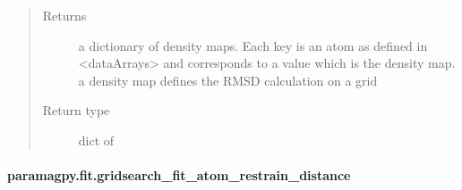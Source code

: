 \documentclass[a4paper,10pt,english,openany,oneside]{sphinxmanual}
\begin{document}
\begin{fulllineitems}
\begin{quote}
\begin{description}
\begin{itemize}
\end{itemize}

\item[{Returns}] \leavevmode
\sphinxAtStartPar
{} \textendash{} a dictionary of density maps. Each key is an atom
as defined in \textless{}dataArrays\textgreater{} and corresponds to a value
which is the density map.
a density map defines the RMSD calculation on a grid

\item[{Return type}] \leavevmode
\sphinxAtStartPar
dict of {\hyperref[\detokenize{reference/generated/paramagpy.fit.DensityMap:paramagpy.fit.DensityMap}]{}}

\end{description}\end{quote}

\end{fulllineitems}



\paragraph{paramagpy.fit.gridsearch\_fit\_atom\_restrain\_distance}
\label{\detokenize{reference/generated/paramagpy.fit.gridsearch_fit_atom_restrain_distance:paramagpy-fit-gridsearch-fit-atom-restrain-distance}}\label{\detokenize{reference/generated/paramagpy.fit.gridsearch_fit_atom_restrain_distance::doc}}
\end{document}
